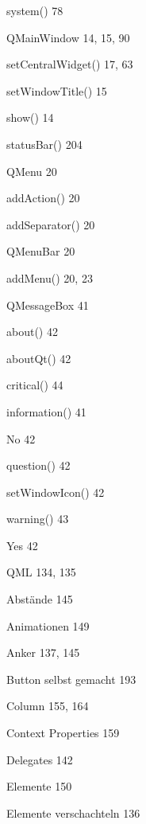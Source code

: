 \documentclass{book}
\renewcommand\subitem{\par}
\begin{document}
\begin{multicols}{2}
\begin{osp-index}
    \subitem system()\hspace{1mm} 78
  \item QMainWindow\hspace{1mm} 14, 15, 90
    \subitem setCentralWidget()\hspace{1mm} 17, 63
    \subitem setWindowTitle()\hspace{1mm} 15
    \subitem show()\hspace{1mm} 14
    \subitem statusBar()\hspace{1mm} 204
  \item QMenu\hspace{1mm} 20
    \subitem addAction()\hspace{1mm} 20
    \subitem addSeparator()\hspace{1mm} 20
  \item QMenuBar\hspace{1mm} 20
    \subitem addMenu()\hspace{1mm} 20, 23
  \item QMessageBox\hspace{1mm} 41
    \subitem about()\hspace{1mm} 42
    \subitem aboutQt()\hspace{1mm} 42
    \subitem critical()\hspace{1mm} 44
    \subitem information()\hspace{1mm} 41
    \subitem No\hspace{1mm} 42
    \subitem question()\hspace{1mm} 42
    \subitem setWindowIcon()\hspace{1mm} 42
    \subitem warning()\hspace{1mm} 43
    \subitem Yes\hspace{1mm} 42
  \item QML\hspace{1mm} 134, 135
    \subitem Abst\"ande\hspace{1mm} 145
    \subitem Animationen\hspace{1mm} 149
    \subitem Anker\hspace{1mm} 137, 145
    \subitem Button selbst gemacht\hspace{1mm} 193
    \subitem Column\hspace{1mm} 155, 164
    \subitem Context Properties\hspace{1mm} 159
    \subitem Delegates\hspace{1mm} 142
    \subitem Elemente\hspace{1mm} 150
    \subitem Elemente verschachteln\hspace{1mm} 136

\end{osp-index}
\end{multicols}
\end{document}
